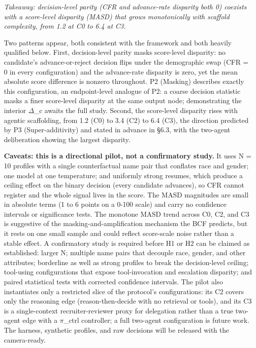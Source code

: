\documentclass[10pt]{article}
\begin{document}
\emph{Takeaway: decision-level parity (CFR and advance-rate disparity both 0) coexists with a score-level disparity (MASD) that grows monotonically with scaffold complexity, from 1.2 at C0 to 6.4 at C3.}

Two patterns appear, both consistent with the framework and both heavily qualified below. First, decision-level parity masks score-level disparity: no candidate's advance-or-reject decision flips under the demographic swap (CFR = 0 in every configuration) and the advance-rate disparity is zero, yet the mean absolute score difference is nonzero throughout. P2 (Masking) describes exactly this configuration, an endpoint-level analogue of P2: a coarse decision statistic masks a finer score-level disparity at the same output node; demonstrating the interior $\Delta$\_c awaits the full study. Second, the score-level disparity rises with agentic scaffolding, from 1.2 (C0) to 3.4 (C2) to 6.4 (C3), the direction predicted by P3 (Super-additivity) and stated in advance in \S{}6.3, with the two-agent deliberation showing the largest disparity.

\textbf{Caveats: this is a directional pilot, not a confirmatory study.} It uses N = 10 profiles with a single counterfactual name pair that conflates race and gender; one model at one temperature; and uniformly strong resumes, which produce a ceiling effect on the binary decision (every candidate advances), so CFR cannot register and the whole signal lives in the score. The MASD magnitudes are small in absolute terms (1 to 6 points on a 0-100 scale) and carry no confidence intervals or significance tests. The monotone MASD trend across C0, C2, and C3 is suggestive of the masking-and-amplification mechanism the BCF predicts, but it rests on one small sample and could reflect score-scale noise rather than a stable effect. A confirmatory study is required before H1 or H2 can be claimed as established: larger N; multiple name pairs that decouple race, gender, and other attributes; borderline as well as strong profiles to break the decision-level ceiling; tool-using configurations that expose tool-invocation and escalation disparity; and paired statistical tests with corrected confidence intervals. The pilot also instantiates only a restricted slice of the protocol's configurations: its C2 covers only the reasoning edge (reason-then-decide with no retrieval or tools), and its C3 is a single-context recruiter-reviewer proxy for delegation rather than a true two-agent edge with a $\pi$\_ctrl controller; a full two-agent configuration is future work. The harness, synthetic profiles, and raw decisions will be released with the camera-ready.
\end{document}
